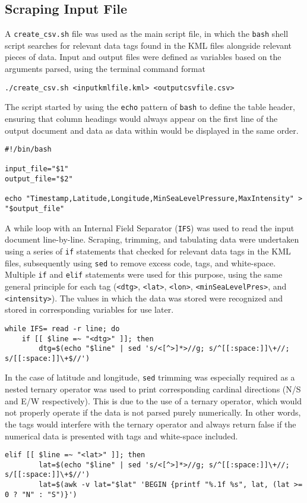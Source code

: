 \documentclass[]{article}
\begin{document}
    \subsection{Scraping Input File}
    A \verb|create_csv.sh| file was used as the main script file, in which the \verb|bash| shell script searches for relevant data tags found in the KML files alongside relevant pieces of data. Input and output files were defined as variables based on the arguments parsed, using the terminal command format \begin{verbatim}
./create_csv.sh <inputkmlfile.kml> <outputcsvfile.csv>
    \end{verbatim}
    The script started by using the \verb|echo| pattern of \verb|bash| to define the table header, ensuring that column headings would always appear on the first line of the output document and data as data within would be displayed in the same order.
    \begin{verbatim}
#!/bin/bash

input_file="$1"
output_file="$2"

echo "Timestamp,Latitude,Longitude,MinSeaLevelPressure,MaxIntensity" > "$output_file"
    \end{verbatim}
    A while loop with an Internal Field Separator (\verb|IFS|) was used to read the input document line-by-line. Scraping, trimming, and tabulating data were undertaken using a series of \verb|if| statements that checked for relevant data tags in the KML files, subsequently using \verb|sed| to remove excess code, tags, and white-space. Multiple \verb|if| and \verb|elif| statements were used for this purpose, using the same general principle for each tag (\verb|<dtg>|, \verb|<lat>|, \verb|<lon>|, \verb|<minSeaLevelPres>|, and \verb|<intensity>|). The values in which the data was stored were recognized and stored in corresponding variables for use later.
    \begin{verbatim}
while IFS= read -r line; do
    if [[ $line =~ "<dtg>" ]]; then
        dtg=$(echo "$line" | sed 's/<[^>]*>//g; s/^[[:space:]]\+//; s/[[:space:]]\+$//')
    \end{verbatim}
    In the case of latitude and longitude, \verb|sed| trimming was especially required as a nested ternary operator was used to print corresponding cardinal directions (N/S and E/W respectively). This is due to the use of a ternary operator, which would not properly operate if the data is not parsed purely numerically. In other words, the tags would interfere with the ternary operator and always return false if the numerical data is presented with tags and white-space included.
    \begin{verbatim}
elif [[ $line =~ "<lat>" ]]; then
        lat=$(echo "$line" | sed 's/<[^>]*>//g; s/^[[:space:]]\+//; s/[[:space:]]\+$//')
        lat=$(awk -v lat="$lat" 'BEGIN {printf "%.1f %s", lat, (lat >= 0 ? "N" : "S")}')
    \end{verbatim}
\end{document}
